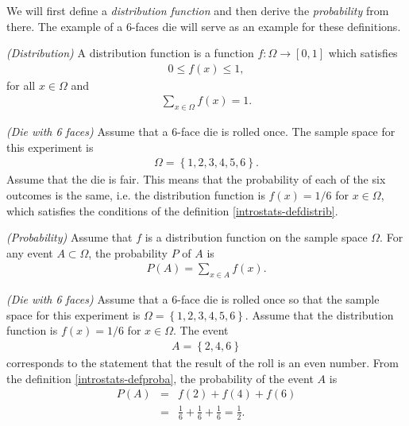 We will first define a \emph{distribution function} and then derive 
the \emph{probability} from there. The example of a 6-faces die will
serve as an example for these definitions.

\begin{definition}
\emph{(Distribution)}
\label{introstats-defdistrib}
A distribution function is a function $f:\Omega\rightarrow [0,1]$ which 
satisfies 
\begin{eqnarray}
0\leq f(x)\leq 1, \label{introstats-fin01}
\end{eqnarray}
for all $x\in\Omega$ and 
\begin{eqnarray}
\sum_{x\in\Omega} f(x)= 1 \label{introstats-sumfeq1}.
\end{eqnarray}
\end{definition}

\begin{example}
\emph{(Die with 6 faces)}
\label{introstats-die6faces}
Assume that a 6-face die is rolled once. The sample space for this experiment is
\begin{eqnarray}
\Omega=\left\{1,2,3,4,5,6\right\}.
\end{eqnarray}
Assume that the die is fair. This means that the probability 
of each of the six outcomes is the same, i.e. the distribution function is 
$f(x)=1/6$ for $x\in\Omega$, which satisfies the conditions of the definition 
\ref{introstats-defdistrib}.
\end{example}

\begin{definition}
\emph{(Probability)}
\label{introstats-defproba}
Assume that $f$ is a distribution function on the sample space $\Omega$.
For any event $A\subset \Omega$, the probability $P$ of $A$ is 
\begin{eqnarray}
P(A) = \sum_{x\in A} f(x) \label{introstats-probasumf}.
\end{eqnarray}
\end{definition}

\begin{example}
\emph{(Die with 6 faces)}
\label{introstats-die6faces2}
Assume that a 6-face die is rolled once so that the sample space for this experiment is
$\Omega=\left\{1,2,3,4,5,6\right\}$.
Assume that the distribution function is $f(x)=1/6$ for $x\in\Omega$.
The event 
\begin{eqnarray}
A=\left\{2,4,6\right\}
\end{eqnarray}
corresponds to the statement that the result of the roll is an even number.
From the definition \ref{introstats-defproba}, the probability of the 
event $A$ is 
\begin{eqnarray}
P(A)&=&f(2) + f(4) + f(6) \\
&=& \frac{1}{6} + \frac{1}{6} + \frac{1}{6} = \frac{1}{2}.
\end{eqnarray}
\end{example}

